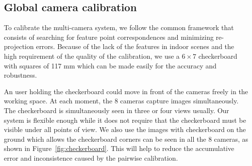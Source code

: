 
\subsection{Global camera calibration}
\label{sec:global-calib}


To calibrate the multi-camera system, we follow the common framework that consists of searching for feature point correspondences and minimizing re-projection errors.
%
Because of the lack of the features in indoor scenes and the high requirement of the quality of the calibration, we use a $6\times7$ checkerboard with squares of 117 mm which can be made easily for the accuracy and robustness.

%
An user holding the checkerboard could move in front of the cameras freely in the working space.
At each moment, the 8 cameras capture images simultaneously.
%
The checkerboard is simultaneously seen in three or four views usually.
%
Our system is flexible enough while it does not require that the checkerboard must be visible under all points of view.
%
We also use the images with checkerboard on the ground which allows the checkerboard corners can be seen in all the 8 cameras, as shown in Figure~\ref{fig:checkerboard}.
This will help to reduce the accumulative error and inconsistence caused by the pairwise calibration.
